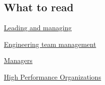 \subsection{What to read}

\href{https://github.com/LappleApple/awesome-leading-and-managing}{Leading and managing}

\href{https://github.com/kdeldycke/awesome-engineering-team-management}{Engineering team management}

\href{https://github.com/ankitjaininfo/awesome-managers}{Managers}

\href{https://github.com/pdfernhout/High-Performance-Organizations-Reading-List}{High Performance Organizations}
